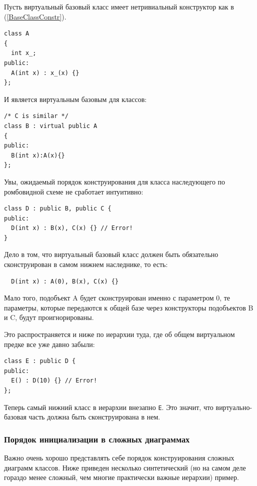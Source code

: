 \documentclass[a4paper,12pt,oneside]{article}
\begin{document}
Пусть виртуальный базовый класс имеет нетривиальный конструктор как в (\ref{BaseClassConstr}).

\begin{lstlisting}
class A 
{
  int x_;
public:
  A(int x) : x_(x) {}
};
\end{lstlisting}

И является виртуальным базовым для классов:

\begin{lstlisting}
/* C is similar */
class B : virtual public A
{
public:
  B(int x):A(x){}
};
\end{lstlisting}

Увы, ожидаемый порядок конструирования для класса наследующего по ромбовидной схеме не сработает интуитивно:

\begin{lstlisting}
class D : public B, public C {
public:
  D(int x) : B(x), C(x) {} // Error!
}
\end{lstlisting}

Дело в том, что виртуальный базовый класс должен быть обязательно сконструирован в самом нижнем наследнике, то есть:

\begin{lstlisting}
  D(int x) : A(0), B(x), C(x) {} 
\end{lstlisting}

Мало того, подобъект A будет сконструирован именно с параметром 0, те параметры, которые передаются к общей базе через конструкторы подобъектов B и C, будут проигнорированы.

Это распространяется и ниже по иерархии туда, где об общем виртуальном предке все уже давно забыли:

\begin{lstlisting}
class E : public D {
public:
  E() : D(10) {} // Error!
};
\end{lstlisting}

Теперь самый нижний класс в иерархии внезапно \lstinline!E!. Это значит, что виртуально-базовая часть должна быть сконструирована в нем.

\subsubsection{Порядок инициализации в сложных диаграммах}\label{InitOrder}

Важно очень хорошо представлять себе порядок конструирования сложных диаграмм классов. Ниже приведен несколько синтетический (но на самом деле гораздо менее сложный, чем многие практически важные иерархии) пример.
\end{document}
